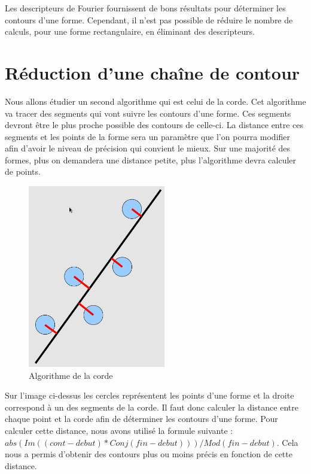 \documentclass[11pt]{article}
\begin{document}
  Les descripteurs de Fourier fournissent de bons résultats pour déterminer les contours d'une forme. 
  Cependant, il n'est pas possible de réduire le nombre de calculs, pour une forme rectangulaire, 
  en éliminant des descripteurs.

  \section{Réduction d'une chaîne de contour}
  Nous allons étudier un second algorithme qui est celui de la corde.
  Cet algorithme va tracer des segments qui vont suivre les contours d'une forme. Ces segments 
  devront être le plus proche possible des contours de celle-ci. La distance entre ces segments 
  et les points de la forme sera un paramètre que l'on pourra modifier afin d'avoir le niveau de 
  précision qui convient le mieux. Sur une majorité des formes, plus on demandera une distance petite, 
  plus l'algorithme devra calculer de points.\\ 
  
  
  \begin{figure}[!h]
    \begin{center}
      \includegraphics[width=6cm]{corde.png}
    \end{center}
    \caption{Algorithme de la corde}
  \end{figure}
  
  
  Sur l'image ci-dessus les cercles représentent les points d'une forme et la droite correspond
  à un des segments de la corde. Il faut donc calculer la distance entre chaque point et la corde
  afin de déterminer les contours d'une forme.
  Pour calculer cette distance, nous avons utilisé la formule suivante :
  $abs(Im((cont - debut) * Conj(fin - debut))) / Mod(fin - debut)$.
  Cela nous a permis d'obtenir des contours plus ou moins précis en fonction de cette distance.\\
  
\end{document}
